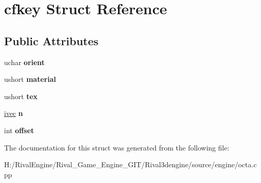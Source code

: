 \hypertarget{structcfkey}{}\section{cfkey Struct Reference}
\label{structcfkey}
\subsection*{Public Attributes}
\begin{DoxyCompactItemize}
\item 
\mbox{\label{structcfkey_a6b685cc0fb0326eb0e62f7f99dd014cd}} 
uchar {\bfseries orient}
\item 
\mbox{\label{structcfkey_a48205f9a7889b2cc7f0451067e0d13ad}} 
ushort {\bfseries material}
\item 
\mbox{\label{structcfkey_a1525417422cde25899112def5af4dfcf}} 
ushort {\bfseries tex}
\item 
\mbox{\label{structcfkey_a92dbec1c0b4605a0b8e430fd8cb758d7}} 
\hyperlink{structivec}{ivec} {\bfseries n}
\item 
\mbox{\label{structcfkey_aeef5ec78490281e4628ba8062d2f2b34}} 
int {\bfseries offset}
\end{DoxyCompactItemize}


The documentation for this struct was generated from the following file\+:\begin{DoxyCompactItemize}
\item 
H\+:/\+Rival\+Engine/\+Rival\+\_\+\+Game\+\_\+\+Engine\+\_\+\+G\+I\+T/\+Rival3dengine/source/engine/octa.\+cpp\end{DoxyCompactItemize}
